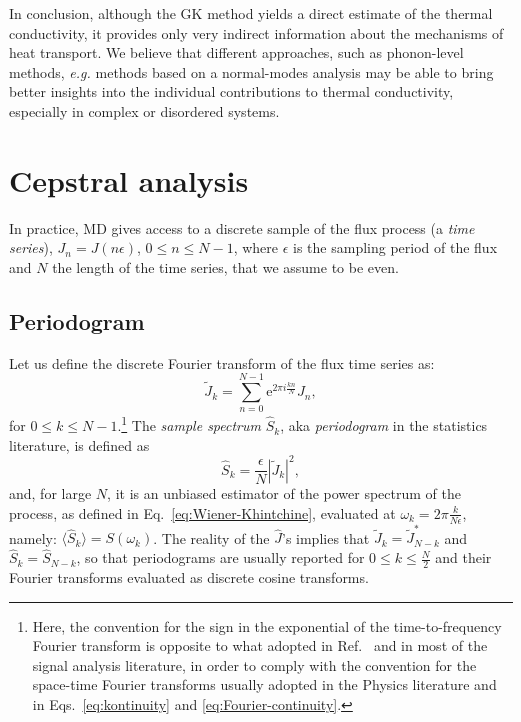 \begin{LEtext}
In conclusion, although the GK method yields a direct estimate of the thermal conductivity, it provides only very indirect information about the mechanisms of heat transport. We believe that different approaches, such as phonon-level methods, \emph{e.g.} methods based on a normal-modes analysis \cite{Esfarjani2011} may be able to bring better insights into the individual contributions to thermal conductivity, especially in complex or disordered systems. 
\end{LEtext}


\section{Cepstral analysis}  \label{sec:cepstral-analysis}

In practice, MD gives access to a discrete sample of the flux process (a \emph{time series}), $J_n = J(n \epsilon)$, $0 \leq n \leq N-1$, where $\epsilon$ is the sampling period of the flux and $N$ the length of the time series, that we assume to be even. 


\subsection{Periodogram}
Let us define the discrete Fourier transform of the flux time series as:
\begin{equation}
  \tilde{J}_{k}=\sum_{n=0}^{N-1} \mathrm{e}^{ 2\pi i\frac{kn}{N}} J_n, \label{eq:Jk}
\end{equation}
for $0 \leq k \leq N-1$.\footnote{Here, the convention for the sign in the exponential of the time-to-frequency Fourier transform is opposite to what adopted in Ref.~\cite{Ercole2017} and in most of the signal analysis literature, in order to comply with the convention for the space-time Fourier transforms usually adopted in the Physics literature and in Eqs.~\eqref{eq:kontinuity} and \eqref{eq:Fourier-continuity}.}
The \emph{sample spectrum} $\hat S_k$, aka \emph{periodogram} in the statistics literature, is defined as
\begin{equation}
\hat{S}_{k}=\frac{\epsilon}{N} \left |\tilde{J}_{k} \right |^2, \label{eq:periodogram-def}
\end{equation}
and, for large $N$, it is an unbiased estimator of the power spectrum of the process, as defined in Eq.~\eqref{eq:Wiener-Khintchine}, evaluated at $\omega_k=2\pi\frac{k}{N\epsilon}$, namely: $\langle \hat S_k \rangle = S(\omega_k)$. The reality of the $\hat J$'s implies that $\tilde J_k=\tilde J^*_{N-k}$ and $\hat S_k=\hat S_{N-k}$, so that periodograms are usually reported for $0\leq k\leq \frac{N}{2}$ and their Fourier transforms evaluated as discrete cosine transforms.

